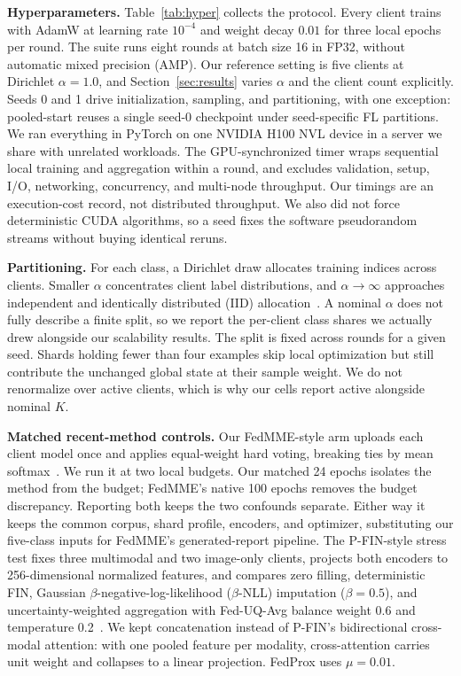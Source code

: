 \documentclass[letterpaper, conference]{IEEEtran}
\begin{document}
\textbf{Hyperparameters.}
Table~\ref{tab:hyper} collects the protocol. Every client trains with AdamW at
learning rate $10^{-4}$ and weight decay $0.01$ for three local epochs per round.
The suite runs eight rounds at batch size 16 in FP32, without automatic mixed
precision (AMP). Our reference setting is five clients at Dirichlet $\alpha=1.0$,
and Section~\ref{sec:results} varies $\alpha$ and the client count explicitly. Seeds
0 and 1 drive initialization, sampling, and partitioning, with one exception:
pooled-start reuses a single seed-0 checkpoint under seed-specific FL partitions. We
ran everything in PyTorch on one NVIDIA H100 NVL device in a server we share with
unrelated workloads. The GPU-synchronized timer wraps sequential local training and
aggregation within a round, and excludes validation, setup, I/O, networking,
concurrency, and multi-node throughput. Our timings are an execution-cost record,
not distributed throughput. We also did not force deterministic CUDA algorithms, so
a seed fixes the software pseudorandom streams without buying identical reruns.

\textbf{Partitioning.}
For each class, a Dirichlet draw allocates training indices across clients. Smaller
$\alpha$ concentrates client label distributions, and $\alpha\!\to\!\infty$
approaches independent and identically distributed (IID)
allocation~\cite{Hsu2019}. A nominal $\alpha$ does not fully describe a finite split,
so we report the per-client class shares we actually drew alongside our scalability
results. The split is fixed across rounds for a given seed. Shards
holding fewer than four examples skip local optimization but still contribute the
unchanged global state at their sample weight. We do not renormalize over active
clients, which is why our cells report active alongside nominal $K$.

\textbf{Matched recent-method controls.}
Our FedMME-style arm uploads each client model once and applies equal-weight hard
voting, breaking ties by mean softmax~\cite{Wang2025fedmme}. We run it at two local
budgets. Our matched 24 epochs isolates the method from the budget; FedMME's native
100 epochs removes the budget discrepancy. Reporting both keeps the two confounds
separate. Either way it keeps the common corpus,
shard profile, encoders, and optimizer, substituting our five-class inputs for
FedMME's generated-report pipeline. The P-FIN-style stress test fixes
three multimodal and two image-only clients, projects both encoders to
256-dimensional normalized features, and compares zero filling, deterministic FIN,
Gaussian $\beta$-negative-log-likelihood ($\beta$-NLL) imputation ($\beta{=}0.5$),
and uncertainty-weighted aggregation with Fed-UQ-Avg balance weight 0.6 and
temperature 0.2~\cite{Shahid2026pfin}. We kept concatenation instead of P-FIN's
bidirectional cross-modal attention: with one pooled feature per modality,
cross-attention carries unit weight and collapses to a linear projection. FedProx uses $\mu{=}0.01$.
\end{document}
